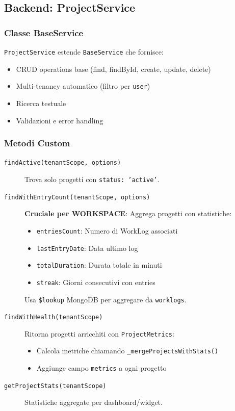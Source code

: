 \documentclass[11pt,a4paper]{article}
\begin{document}
\subsection{Backend: ProjectService}

\subsubsection{Classe BaseService}

\texttt{ProjectService} estende \texttt{BaseService} che fornisce:
\begin{itemize}
    \item CRUD operations base (find, findById, create, update, delete)
    \item Multi-tenancy automatico (filtro per \texttt{user})
    \item Ricerca testuale
    \item Validazioni e error handling
\end{itemize}

\subsubsection{Metodi Custom}

\begin{description}
    \item[\texttt{findActive(tenantScope, options)}] 
    Trova solo progetti con \texttt{status: 'active'}.
    
    \item[\texttt{findWithEntryCount(tenantScope, options)}]
    \textbf{Cruciale per WORKSPACE}: Aggrega progetti con statistiche:
    \begin{itemize}
        \item \texttt{entriesCount}: Numero di WorkLog associati
        \item \texttt{lastEntryDate}: Data ultimo log
        \item \texttt{totalDuration}: Durata totale in minuti
        \item \texttt{streak}: Giorni consecutivi con entries
    \end{itemize}
    Usa \texttt{\$lookup} MongoDB per aggregare da \texttt{worklogs}.
    
    \item[\texttt{findWithHealth(tenantScope)}]
    Ritorna progetti arricchiti con \texttt{ProjectMetrics}:
    \begin{itemize}
        \item Calcola metriche chiamando \texttt{\_mergeProjectsWithStats()}
        \item Aggiunge campo \texttt{metrics} a ogni progetto
    \end{itemize}
    
    \item[\texttt{getProjectStats(tenantScope)}]
    Statistiche aggregate per dashboard/widget.
\end{description}
\end{document}
